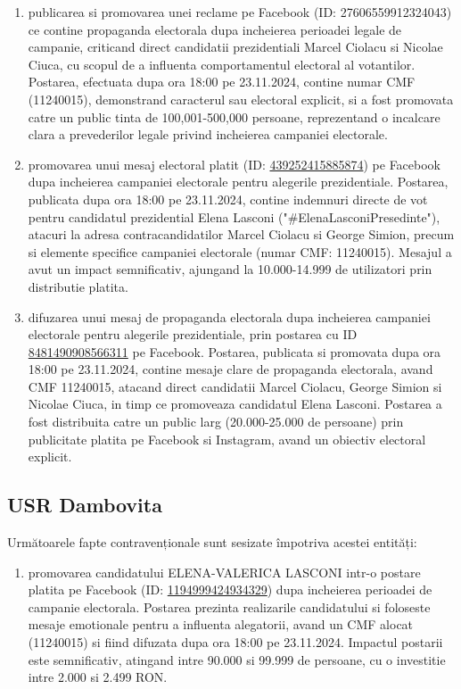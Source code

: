 \documentclass[a4paper,12pt]{article}
\begin{document}
\begin{enumerate}[leftmargin=*, label=\arabic*.)]
    \item publicarea si promovarea unei reclame pe Facebook (ID: 27606559912324043) ce contine propaganda electorala dupa incheierea perioadei legale de campanie, criticand direct candidatii prezidentiali Marcel Ciolacu si Nicolae Ciuca, cu scopul de a influenta comportamentul electoral al votantilor. Postarea, efectuata dupa ora 18:00 pe 23.11.2024, contine numar CMF (11240015), demonstrand caracterul sau electoral explicit, si a fost promovata catre un public tinta de 100,001-500,000 persoane, reprezentand o incalcare clara a prevederilor legale privind incheierea campaniei electorale.
    \item promovarea unui mesaj electoral platit (ID: \href{https://www.facebook.com/ads/library/?id=439252415885874}{439252415885874}) pe Facebook dupa incheierea campaniei electorale pentru alegerile prezidentiale. Postarea, publicata dupa ora 18:00 pe 23.11.2024, contine indemnuri directe de vot pentru candidatul prezidential Elena Lasconi ("\#ElenaLasconiPresedinte"), atacuri la adresa contracandidatilor Marcel Ciolacu si George Simion, precum si elemente specifice campaniei electorale (numar CMF: 11240015). Mesajul a avut un impact semnificativ, ajungand la 10.000-14.999 de utilizatori prin distributie platita.
    \item difuzarea unui mesaj de propaganda electorala dupa incheierea campaniei electorale pentru alegerile prezidentiale, prin postarea cu ID \href{https://www.facebook.com/ads/library/?id=8481490908566311}{8481490908566311} pe Facebook. Postarea, publicata si promovata dupa ora 18:00 pe 23.11.2024, contine mesaje clare de propaganda electorala, avand CMF 11240015, atacand direct candidatii Marcel Ciolacu, George Simion si Nicolae Ciuca, in timp ce promoveaza candidatul Elena Lasconi. Postarea a fost distribuita catre un public larg (20.000-25.000 de persoane) prin publicitate platita pe Facebook si Instagram, avand un obiectiv electoral explicit.
\end{enumerate}

\vspace{0.5cm}

\subsection{USR Dambovita}
Următoarele fapte contravenționale sunt sesizate împotriva acestei entități:

\begin{enumerate}[leftmargin=*, label=\arabic*.)]
    \item promovarea candidatului ELENA-VALERICA LASCONI intr-o postare platita pe Facebook (ID: \href{https://www.facebook.com/ads/library/?id=1194999424934329}{1194999424934329}) dupa incheierea perioadei de campanie electorala. Postarea prezinta realizarile candidatului si foloseste mesaje emotionale pentru a influenta alegatorii, avand un CMF alocat (11240015) si fiind difuzata dupa ora 18:00 pe 23.11.2024. Impactul postarii este semnificativ, atingand intre 90.000 si 99.999 de persoane, cu o investitie intre 2.000 si 2.499 RON.
\end{enumerate}
\end{document}
